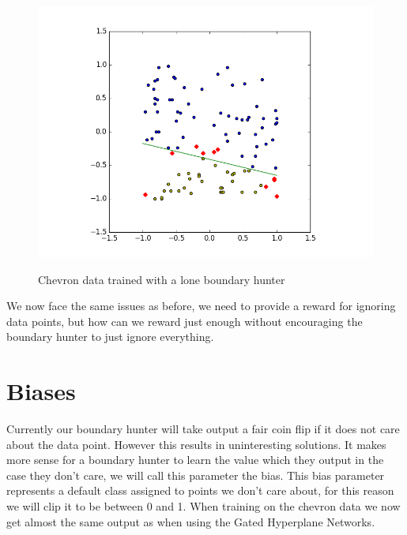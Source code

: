\documentclass[notitlepage]{report}
\theoremstyle{definition}
\begin{document}
\begin{figure}[H]
  \centering
  \begin{minipage}[b]{0.8\textwidth}
    \includegraphics[width=\textwidth]{CHEVData-SingleBH.png}
    \caption{}
  \end{minipage}
  \hfill

Chevron data trained with a lone boundary hunter
\end{figure}

We now face the same issues as before, we need to provide a reward for ignoring data points, but how can we reward just enough without encouraging the boundary hunter to just ignore everything.

\section{Biases}
Currently our boundary hunter will take output a fair coin flip if it does not care about the data point. However this results in uninteresting solutions. It makes more sense for a boundary hunter to learn the value which they output in the case they don't care, we will call this parameter the bias. This bias parameter represents a default class assigned to points we don't care about, for this reason we will clip it to be between 0 and 1. When training on the chevron data we now get almost the same output as when using the Gated Hyperplane Networks.
\end{document}
